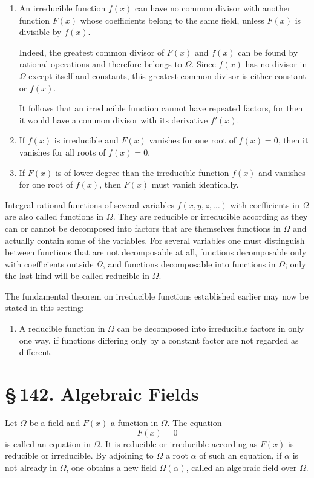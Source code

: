 \documentclass[11pt]{article}
\providecommand{\sect}[2]{\section*{\S\,#1. #2}}
\begin{document}
\begin{enumerate}[label=\Roman*.,leftmargin=2.8em]
\item An irreducible function $f(x)$ can have no common divisor with another function $F(x)$ whose coefficients belong to the same field, unless $F(x)$ is divisible by $f(x)$.

Indeed, the greatest common divisor of $F(x)$ and $f(x)$ can be found by rational operations and therefore belongs to $\Omega$. Since $f(x)$ has no divisor in $\Omega$ except itself and constants, this greatest common divisor is either constant or $f(x)$.

It follows that an irreducible function cannot have repeated factors, for then it would have a common divisor with its derivative $f'(x)$.

\item If $f(x)$ is irreducible and $F(x)$ vanishes for one root of $f(x)=0$, then it vanishes for all roots of $f(x)=0$.

\item If $F(x)$ is of lower degree than the irreducible function $f(x)$ and vanishes for one root of $f(x)$, then $F(x)$ must vanish identically.
\end{enumerate}

Integral rational functions of several variables $f(x,y,z,\ldots)$ with coefficients in $\Omega$ are also called functions in $\Omega$. They are reducible or irreducible according as they can or cannot be decomposed into factors that are themselves functions in $\Omega$ and actually contain some of the variables. For several variables one must distinguish between functions that are not decomposable at all, functions decomposable only with coefficients outside $\Omega$, and functions decomposable into functions in $\Omega$; only the last kind will be called reducible in $\Omega$.

The fundamental theorem on irreducible functions established earlier may now be stated in this setting:

\begin{enumerate}[label=\Roman*.,leftmargin=2.8em,start=4]
\item A reducible function in $\Omega$ can be decomposed into irreducible factors in only one way, if functions differing only by a constant factor are not regarded as different.
\end{enumerate}

\sect{142}{Algebraic Fields}

Let $\Omega$ be a field and $F(x)$ a function in $\Omega$. The equation
\[
\tag{1}
        F(x)=0
\]
is called an equation in $\Omega$. It is reducible or irreducible according as $F(x)$ is reducible or irreducible. By adjoining to $\Omega$ a root $\alpha$ of such an equation, if $\alpha$ is not already in $\Omega$, one obtains a new field $\Omega(\alpha)$, called an algebraic field over $\Omega$.
\end{document}
